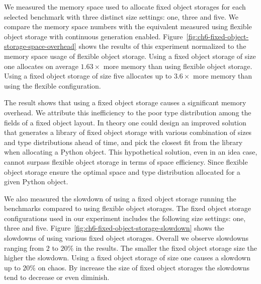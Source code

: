 We measured the memory space used to allocate fixed object storages for each selected benchmark with three distinct size settings: one, three and five.
We compare the memory space numbers with the equivalent measured using flexible object storage with continuous generation enabled.
Figure~\ref{fig:ch6-fixed-object-storage-space-overhead} shows the results of this experiment normalized to the memory space usage of flexible object storage.
Using a fixed object storage of size one allocates on average $1.63\times$ more memory than using flexible object storage.
Using a fixed object storage of size five allocates up to $3.6\times$ more memory than using the flexible configuration.

The result shows that using a fixed object storage causes a significant memory overhead.
We attribute this inefficiency to the poor type distribution among the fields of a fixed object layout.
In theory one could design an improved solution that generates a library of fixed object storage with various combination of sizes and type distributions ahead of time, and pick the closest fit from the library when allocating a Python object.
This hypothetical solution, even in an idea case, cannot surpass flexible object storage in terms of space efficiency.
Since flexible object storage ensure the optimal space and type distribution allocated for a given Python object.

We also measured the slowdown of using a fixed object storage running the benchmarks compared to using flexible object storages.
The fixed object storage configurations used in our experiment includes the following size settings: one, three and five.
Figure~\ref{fig:ch6-fixed-object-storage-slowdown} shows the slowdowns of using various fixed object storages.
Overall we observe slowdowns ranging from $2$ to $20\%$ in the results.
The smaller the fixed object storage size the higher the slowdown.
Using a fixed object storage of size one causes a slowdown up to $20\%$ on \textsf{chaos}.
By increase the size of fixed object storages the slowdowns tend to decrease or even diminish.


